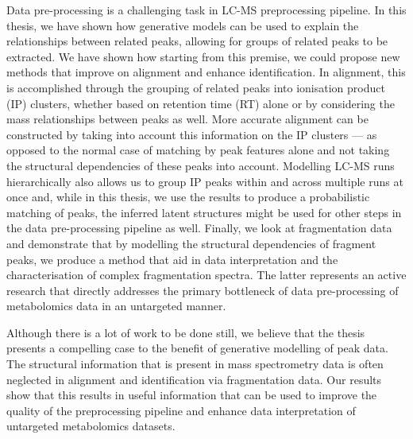 Data pre-processing is a challenging task in LC-MS preprocessing pipeline. In this thesis, we have shown how generative models can be used to explain the relationships between related peaks, allowing for groups of related peaks to be extracted. We have shown how starting from this premise, we could propose new methods that improve on alignment and enhance identification. In alignment, this is accomplished through the grouping of related peaks into ionisation product (IP) clusters, whether based on retention time (RT) alone or by considering the mass relationships between peaks as well. More accurate alignment can be constructed by taking into account this information on the IP clusters --- as opposed to the normal case of matching by peak features alone and not taking the structural dependencies of these peaks into account. Modelling LC-MS runs hierarchically also allows us to group IP peaks within and across multiple runs at once and, while in this thesis, we use the results to produce a probabilistic matching of peaks, the inferred latent structures might be used for other steps in the data pre-processing pipeline as well. Finally, we look at fragmentation data and demonstrate that by modelling the structural dependencies of fragment peaks, we produce a method that aid in data interpretation and the characterisation of complex fragmentation spectra. The latter represents an active research that directly addresses the primary bottleneck of data pre-processing of metabolomics data in an untargeted manner.

Although there is a lot of work to be done still, we believe that the thesis presents a compelling case to the benefit of generative modelling of peak data. The structural information that is present in mass spectrometry data is often neglected in alignment and identification via fragmentation data. Our results show that this results in useful information that can be used to improve the quality of the preprocessing pipeline and enhance data interpretation of untargeted metabolomics datasets.